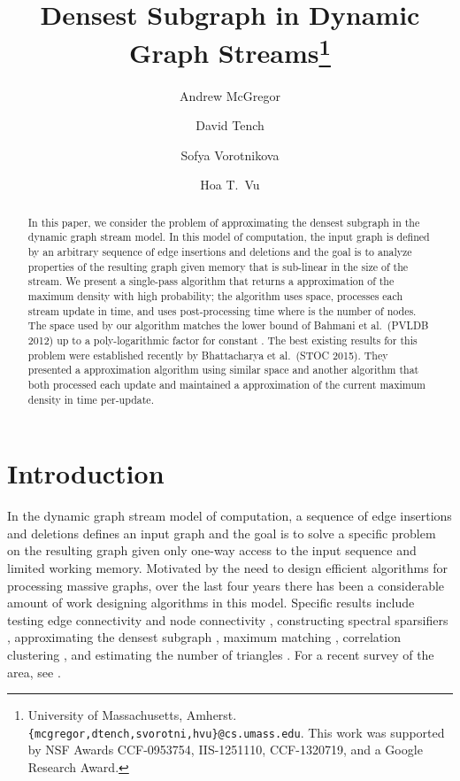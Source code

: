 \documentclass[11pt]{article}
\date{}
\begin{document}
\title{Densest Subgraph in Dynamic Graph Streams\thanks{University of Massachusetts, Amherst. 
\texttt{\{mcgregor,dtench,svorotni,hvu\}@cs.umass.edu}. This work was supported by NSF  Awards CCF-0953754, IIS-1251110,  CCF-1320719, and a Google Research Award.}}
\author{
Andrew McGregor
 \and 
David Tench
 \and 
Sofya Vorotnikova
 \and 
Hoa T.~Vu }
\maketitle

\begin{abstract}
In this paper, we consider the problem of approximating the densest subgraph in the dynamic graph stream model. In this model of computation, the input graph is defined by an arbitrary sequence of edge insertions and deletions and the goal is to analyze properties of the resulting graph given memory that is sub-linear in the size of the stream.
We present a single-pass algorithm that returns a  approximation of the maximum density with high probability; the algorithm uses  space, processes each stream update in  time, and uses  post-processing time where  is the number of nodes.  The space used by our algorithm matches the lower bound of Bahmani  et al.~(PVLDB 2012) up to a poly-logarithmic factor for constant . The best existing results  for this problem were established recently by Bhattacharya et al.~(STOC 2015). They presented a  approximation algorithm using similar space and another algorithm that both processed each update and maintained a  approximation of the current maximum density in  time per-update. 
\end{abstract}

\section{Introduction}
In the dynamic graph stream model of computation, a sequence of edge insertions and deletions defines an input graph and the goal is to solve a specific problem on the resulting graph given only one-way access to the input sequence and limited working memory. Motivated by the need to design efficient algorithms for processing massive graphs, over the last four years there has been a considerable amount of work designing algorithms in this model\cite{AhnCGMW15,AhnGM12a,AhnGM12b,AhnGM13,KapralovLMMS14,KapralovW14,GoelKP12,KutzkovP14a,GuhaMT15,BhattacharyaHNT15,ChitnisCEHMMV15,AssadiKLY15,Konrad15,BuryS15a}. Specific results include testing edge connectivity \cite{AhnGM12b} and node connectivity \cite{GuhaMT15}, constructing spectral sparsifiers \cite{KapralovLMMS14}, approximating the densest subgraph \cite{BhattacharyaHNT15}, maximum matching \cite{ChitnisCEHMMV15,AssadiKLY15,Konrad15,BuryS15a}, correlation clustering \cite{AhnCGMW15}, and estimating the number of triangles \cite{KutzkovP14a}. For a recent survey of the area, see \cite{McGregor14}. 
\end{document}
